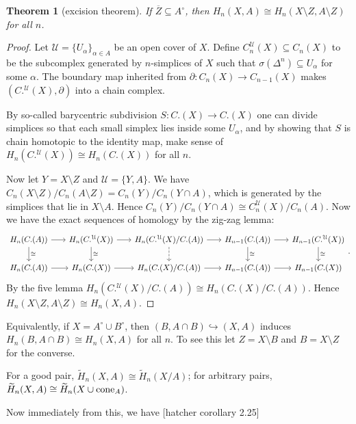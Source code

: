 \documentclass[11pt]{article}
\theoremstyle{definition}
\theoremstyle{plain}
\newtheorem{theorem}{Theorem}[section]
\theoremstyle{remark}
\newcommand{\cone}{\textup{cone}}
\begin{document}
\begin{theorem}[excision theorem]
If $\overline{Z}\subseteq A^\circ$, then $H_n(X,A)\cong H_n(X\setminus Z,A\setminus Z)$ for all $n$.
\end{theorem}
\begin{proof}
Let $\mathcal{U}=\{U_\alpha\}_{\alpha\in A}$ be an open cover of $X$. Define $C_n^\mathcal{U}(X)\subseteq C_n(X)$ to be the subcomplex generated by $n$-simplices of $X$ such that $\sigma(\Delta^n)\subseteq U_\alpha$ for some $\alpha$. The boundary map inherited from $\partial:C_n(X)\to C_{n-1}(X)$ makes $(C.^\mathcal{U}(X),\partial)$ into a chain complex.\medbreak

By so-called barycentric subdivision $S:C.(X)\to C.(X)$ one can divide simplices so that each small simplex lies inside some $U_\alpha$, and by showing that $S$ is chain homotopic to the identity map, make sense of $H_n(C.^\mathcal{U}(X))\cong H_n(C.(X))$ for all $n$.\medbreak

Now let $Y=X\setminus Z$ and $\mathcal{U}=\{Y,A\}$. We have $C_n(X\setminus Z)/C_n(A\setminus Z)=C_n(Y)/C_n(Y\cap A)$, which is generated by the simplices that lie in $X\setminus A$. Hence $C_n(Y)/C_n(Y\cap A)\cong C_n^\mathcal{U}(X)/C_n(A)$. Now we have the exact sequences of homology by the zig-zag lemma:
\[\begin{tikzcd}[column sep=scriptsize]
H_n(C.(A))\arrow{d}{\cong}\arrow[r]&H_n(C.^\mathcal{U}(X))\arrow{d}{\cong}\arrow[r]&H_n(C.^\mathcal{U}(X)/C.(A))\arrow[d,dashed]\arrow[r]&H_{n-1}(C.(A))\arrow{d}{\cong}\arrow[r]&H_{n-1}(C.^\mathcal{U}(X))\arrow{d}{\cong}\\
H_n(C.(A))\arrow[r]&H_n(C.(X))\arrow[r]&H_n(C.(X)/C.(A))\arrow[r]&H_{n-1}(C.(A))\arrow[r]&H_{n-1}(C.(X))
\end{tikzcd}.\]
By the five lemma $H_n(C.^\mathcal{U}(X)/C.(A))\cong H_n(C.(X)/C.(A))$. Hence $H_n(X\setminus Z,A\setminus Z)\cong H_n(X,A)$.
\end{proof}

Equivalently, if $X=A^\circ\cup B^\circ$, then $(B,A\cap B)\hookrightarrow(X,A)$ induces $H_n(B,A\cap B)\cong H_n(X,A)$ for all $n$. To see this let $Z=X\setminus B$ and $B=X\setminus Z$ for the converse.\medbreak

For a good pair, $\widetilde{H}_n(X,A)\cong\widetilde{H}_n(X/A)$; for arbitrary pairs, $\widetilde{H}_n(X,A)\cong\widetilde{H}_n(X\cup\cone_A)$.\medbreak

Now immediately from this, we have [hatcher corollary 2.25]
\end{document}
